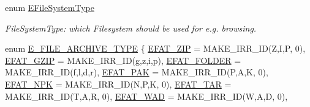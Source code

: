 \begin{DoxyCompactItemize}
enum \hyperlink{namespaceirr_1_1io_a22364f1caf06442a70f6198025af3fe9}{E\+File\+System\+Type} \begin{DoxyCompactList}\small\item\em File\+System\+Type\+: which Filesystem should be used for e.\+g. browsing. \end{DoxyCompactList}
\item 
enum \hyperlink{namespaceirr_1_1io_adb3e3c445ec8e608ed1f0f93306da14f}{E\+\_\+\+F\+I\+L\+E\+\_\+\+A\+R\+C\+H\+I\+V\+E\+\_\+\+T\+Y\+PE} \{ \newline
\hyperlink{namespaceirr_1_1io_adb3e3c445ec8e608ed1f0f93306da14fa1c63139af703acef490625f7bb6b5525}{E\+F\+A\+T\+\_\+\+Z\+IP} = M\+A\+K\+E\+\_\+\+I\+R\+R\+\_\+\+ID(\textquotesingle{}Z\textquotesingle{},\textquotesingle{}I\textquotesingle{},\textquotesingle{}P\textquotesingle{}, 0), 
\hyperlink{namespaceirr_1_1io_adb3e3c445ec8e608ed1f0f93306da14fa3005efdb34b2a4b3bb6c526b486be437}{E\+F\+A\+T\+\_\+\+G\+Z\+IP} = M\+A\+K\+E\+\_\+\+I\+R\+R\+\_\+\+ID(\textquotesingle{}g\textquotesingle{},\textquotesingle{}z\textquotesingle{},\textquotesingle{}i\textquotesingle{},\textquotesingle{}p\textquotesingle{}), 
\hyperlink{namespaceirr_1_1io_adb3e3c445ec8e608ed1f0f93306da14faad790045df641acbac368b3e6c2317f7}{E\+F\+A\+T\+\_\+\+F\+O\+L\+D\+ER} = M\+A\+K\+E\+\_\+\+I\+R\+R\+\_\+\+ID(\textquotesingle{}f\textquotesingle{},\textquotesingle{}l\textquotesingle{},\textquotesingle{}d\textquotesingle{},\textquotesingle{}r\textquotesingle{}), 
\hyperlink{namespaceirr_1_1io_adb3e3c445ec8e608ed1f0f93306da14fa54f4fa2efa9b44e06319231f1c25a89d}{E\+F\+A\+T\+\_\+\+P\+AK} = M\+A\+K\+E\+\_\+\+I\+R\+R\+\_\+\+ID(\textquotesingle{}P\textquotesingle{},\textquotesingle{}A\textquotesingle{},\textquotesingle{}K\textquotesingle{}, 0), 
\newline
\hyperlink{namespaceirr_1_1io_adb3e3c445ec8e608ed1f0f93306da14fab4bfce163db63122a82cd9fda497d8cd}{E\+F\+A\+T\+\_\+\+N\+PK} = M\+A\+K\+E\+\_\+\+I\+R\+R\+\_\+\+ID(\textquotesingle{}N\textquotesingle{},\textquotesingle{}P\textquotesingle{},\textquotesingle{}K\textquotesingle{}, 0), 
\hyperlink{namespaceirr_1_1io_adb3e3c445ec8e608ed1f0f93306da14fa7e11211d542679609b4677e0743569e3}{E\+F\+A\+T\+\_\+\+T\+AR} = M\+A\+K\+E\+\_\+\+I\+R\+R\+\_\+\+ID(\textquotesingle{}T\textquotesingle{},\textquotesingle{}A\textquotesingle{},\textquotesingle{}R\textquotesingle{}, 0), 
\hyperlink{namespaceirr_1_1io_adb3e3c445ec8e608ed1f0f93306da14fa0ee773de0fc5a46aca2e7adca21a6b6d}{E\+F\+A\+T\+\_\+\+W\+AD} = M\+A\+K\+E\+\_\+\+I\+R\+R\+\_\+\+ID(\textquotesingle{}W\textquotesingle{},\textquotesingle{}A\textquotesingle{},\textquotesingle{}D\textquotesingle{}, 0), 

\end{DoxyCompactItemize}
